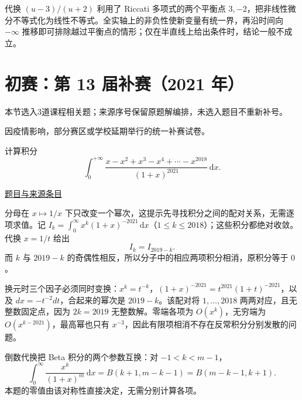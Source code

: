 \documentclass[UTF8,12pt,a4paper,fontset=fandol]{ctexart}
\begin{document}
\begin{remark}[方法与条件]代换 $(u-3)/(u+2)$ 利用了 Riccati 多项式的两个平衡点 $3,-2$，把非线性微分不等式化为线性不等式。全实轴上的非负性使新变量有统一界，再沿时间向 $-\infty$ 推移即可排除越过平衡点的情形；仅在半直线上给出条件时，结论一般不成立。\end{remark}

\section{初赛：第 13 届补赛（2021 年）}

本节选入3道课程相关题；来源序号保留原题解编排，未选入题目不重新补号。

\begin{remark}[来源说明]因疫情影响，部分赛区或学校延期举行的统一补赛试卷。\end{remark}

\begin{example}[来源序号2]\label{ex:ch08-13th-A-makeup:2}\label{pr:ch08-13th-A-makeup:2}

计算积分
\[
\int_{0}^{+\infty}\frac{x-x^{2}+x^{3}-x^{4}+\cdots-x^{2018}}{(1+x)^{2021}}\,\mathrm{d}x.
\]

\par\href{https://github.com/lzxcr/cmc-mathematics/blob/64916fa1fdbc3e444a652eca204d5669058ee321/src/problems/preliminary/13-makeup/02.md}{题目与来源条目}

\end{example}

\begin{solve}\label{ans:ch08-13th-A-makeup:2}

分母在 $x\mapsto1/x$ 下只改变一个幂次，这提示先寻找积分之间的配对关系，无需逐项求值。记 $I_k=\int_0^\infty x^k(1+x)^{-2021}\,\mathrm dx$（$1\leq k\leq2018$）；这些积分都绝对收敛。代换 $x=1/t$ 给出
\[
I_k=I_{2019-k}.
\]
而 $k$ 与 $2019-k$ 的奇偶性相反，所以分子中的相应两项积分相消，原积分等于 $0$。

换元时三个因子必须同时变换：$x^k=t^{-k}$，$(1+x)^{-2021}=t^{2021}(1+t)^{-2021}$，以及 $dx=-t^{-2}dt$，合起来的幂次是 $2019-k$。该配对将 $1,\ldots,2018$ 两两对应，且无整数固定点，因为 $2k=2019$ 无整数解。零端各项为 $O(x^k)$，无穷端为 $O(x^{k-2021})$，最高幂也只有 $x^{-3}$，因此有限项相消不存在反常积分分别发散的问题。

\end{solve}

\begin{remark}[方法与条件]倒数代换把 Beta 积分的两个参数互换：对 $-1<k<m-1$，
\[
\int_0^\infty\frac{x^k}{(1+x)^m}\,\mathrm dx
=B(k+1,m-k-1)=B(m-k-1,k+1).
\]
本题的零值由该对称性直接决定，无需分别计算各项。\end{remark}
\end{document}
